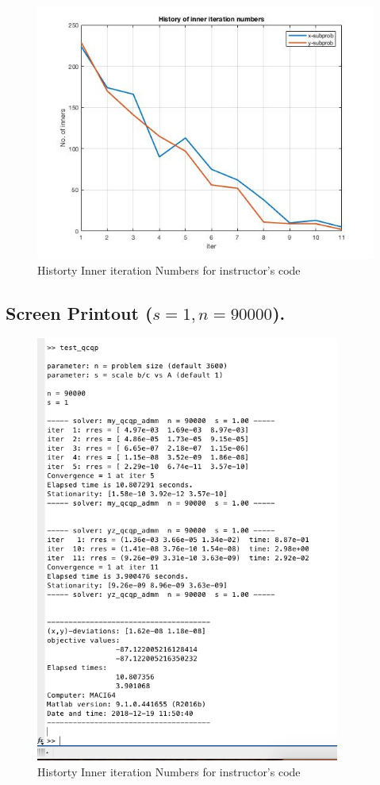 \begin{figure}[H]
\centering
\includegraphics[width=12cm]{F_9/F_1_4.jpg}
\caption{Historty Inner iteration Numbers for instructor's code}
\end{figure}
\subsection{Screen Printout ($s=1,n=90000$).}
\begin{figure}[H]
\centering
\includegraphics[width=10cm]{F_9/F_1_1.png}
\caption{Historty Inner iteration Numbers for instructor's code}
\end{figure}


